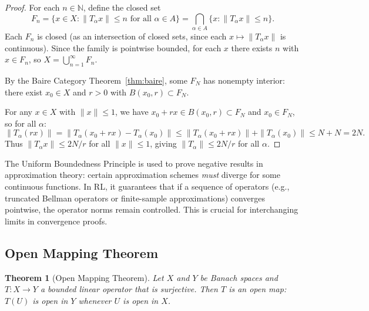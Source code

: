 \documentclass[11pt,a4paper]{article}
\theoremstyle{definition}
\theoremstyle{plain}
\newtheorem{theorem}{Theorem}[section]
\theoremstyle{remark}
\newcommand{\N}{\mathbb{N}}
\begin{document}
\begin{proof}
For each $n \in \N$, define the closed set
\[
    F_n = \{x \in X : \|T_\alpha x\| \leq n \text{ for all } \alpha \in A\}
    = \bigcap_{\alpha \in A} \{x : \|T_\alpha x\| \leq n\}.
\]
Each $F_n$ is closed (as an intersection of closed sets, since each
$x \mapsto \|T_\alpha x\|$ is continuous). Since the family is pointwise
bounded, for each $x$ there exists $n$ with $x \in F_n$, so
$X = \bigcup_{n=1}^\infty F_n$.

By the Baire Category Theorem~\ref{thm:baire}, some $F_N$ has nonempty
interior: there exist $x_0 \in X$ and $r > 0$ with $B(x_0, r) \subset F_N$.

For any $x \in X$ with $\|x\| \leq 1$, we have $x_0 + rx \in B(x_0, r) \subset F_N$
and $x_0 \in F_N$, so for all $\alpha$:
\[
    \|T_\alpha(rx)\| = \|T_\alpha(x_0 + rx) - T_\alpha(x_0)\|
    \leq \|T_\alpha(x_0 + rx)\| + \|T_\alpha(x_0)\| \leq N + N = 2N.
\]
Thus $\|T_\alpha x\| \leq 2N/r$ for all $\|x\| \leq 1$, giving
$\|T_\alpha\| \leq 2N/r$ for all $\alpha$.
\end{proof}

\begin{rlconnection}
The Uniform Boundedness Principle is used to prove negative results in
approximation theory: certain approximation schemes \emph{must} diverge
for some continuous functions. In RL, it guarantees that if a sequence
of operators (e.g., truncated Bellman operators or finite-sample
approximations) converges pointwise, the operator norms remain controlled.
This is crucial for interchanging limits in convergence proofs.
\end{rlconnection}

\subsection{Open Mapping Theorem}

\begin{theorem}[Open Mapping Theorem]\label{thm:open-mapping}
Let $X$ and $Y$ be Banach spaces and $T \colon X \to Y$ a bounded linear
operator that is surjective. Then $T$ is an open map: $T(U)$ is open in $Y$
whenever $U$ is open in $X$.
\end{theorem}
\end{document}

